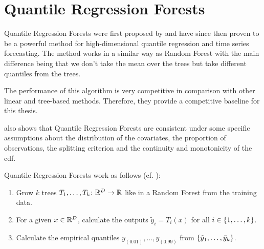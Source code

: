 \section{Quantile Regression Forests}
\label{sec:qrf}

Quantile Regression Forests were first proposed by \Textcite{Meinshausen2006}
and have since then proven to be a powerful method for high-dimensional quantile 
regression and time series forecasting. 
The method works in a similar way as Random Forest with the main difference 
being that we don't take the mean over the trees but take different quantiles 
from the trees.

The performance of this algorithm is very competitive in comparison with other 
linear and tree-based methods.
Therefore, they provide a competitive baseline for this thesis. 

\Textcite{Meinshausen2006} also shows that Quantile Regression Forests are consistent 
under some specific assumptions about the distribution of the covariates, the proportion of observations, the splitting criterion and the 
continuity and monotonicity of the \gls{cdf}.

Quantile Regression Forests work as follows (cf. \Textcite{Meinshausen2006}):
\begin{enumerate}
    \item Grow \(k\) trees \(T_1, \ldots, T_k\colon \mathbb{R}^D \rightarrow \mathbb{R}\) like in a Random Forest from the training data.
    \item For a given \(x\in\mathbb{R}^D\), calculate the outputs \( \tilde{y}_i = T_i(x) \) for all \(i \in \{1, \ldots, k\}\).
    \item Calculate the empirical quantiles \(y_{(0.01)}, \ldots, y_{(0.99)}\) from 
    \(\{\tilde{y}_1, \ldots, \tilde{y}_k\}\).
\end{enumerate}